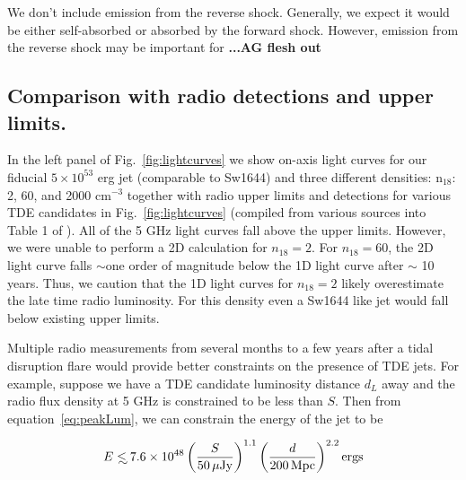 \documentclass[usenatbib,fleqn]{mnras}
\newcommand\lsim{\mathrel{\rlap{\lower4pt\hbox{\hskip1pt$\sim$}}
    \raise1pt\hbox{$<$}}}
\begin{document}
We don't include emission from the reverse
shock. Generally, we expect it would be either self-absorbed or
absorbed by the forward shock. However, emission from the reverse
shock may be important for \textbf{...AG flesh out} 

\subsection{Comparison with radio detections and upper limits.}

In the left panel of Fig.~\ref{fig:lightcurves} we show on-axis light
curves for our fiducial $5\times 10^{53}$ erg jet (comparable to
Sw1644) and three different densities: n$_{18}$: 2, 60, and 2000
cm$^{-3}$ together with radio upper limits and detections for various
TDE candidates in Fig.~\ref{fig:lightcurves} (compiled from various
sources into Table 1 of \citealt{Mimica+2015}).  All of the 5 GHz
light curves fall above the upper limits. However, we were unable to
perform a 2D calculation for $n_{18}=2$.  For $n_{18}=60$, the 2D
light curve falls $\sim$one order of magnitude below the 1D light
curve after $\sim$ 10 years. Thus, we caution that the 1D light curves
for $n_{18}=2$ likely overestimate the late time radio luminosity. For
this density even a Sw1644 like jet would fall below existing upper
limits. 

Multiple radio measurements from several months to a few years after a
tidal disruption flare would provide better constraints on the
presence of TDE jets. For example, suppose we have a TDE candidate
luminosity distance $d_L$ away and the radio flux density at 5 GHz is
constrained to be less than $S$. Then from equation~\eqref{eq:peakLum},
we can constrain the energy of the jet to be

\begin{equation}
E\lsim 7.6 \times 10^{48} \left(\frac{S}{50 \,\mu{\rm Jy}}\right)^{1.1}
  \left(\frac{d}{200 \,{\rm Mpc}}\right)^{2.2} {\rm ergs}
\end{equation}
\end{document}
